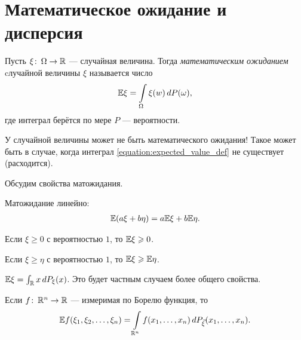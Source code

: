 \documentclass[../main.tex]{subfiles}
\begin{document}
\newpage
\section{Математическое ожидание и дисперсия}
\begin{df}
 Пусть $ \xi \colon \, \Omega \to \mathbb{R}$ --- случайная величина. Тогда \textit{математическим ожиданием} cлучайной величины $ \xi $ называется число
 \begin{align}
  \label{equation:expected_value_def}
  \mathbb E \xi = \int\limits_{\Omega}  \xi(w)\,dP(\omega),
 \end{align} где интеграл берётся по мере $ P $ --- вероятности.
\end{df}
\begin{remrk*}
 У случайной величины может не быть математического ожидания! Такое может быть в случае, когда интеграл \eqref{equation:expected_value_def} не существует (расходится).
\end{remrk*}
Обсудим свойства матожидания.
\begin{prop}
 Матожидание линейно:
 \begin{align*}
  \mathbb E(a\xi + b\eta) = a \mathbb E \xi + b \mathbb E \eta.
 \end{align*} 
\end{prop}
\begin{prop}
 Если $ \xi \geqslant 0 $ с вероятностью $ 1 $, то $ \mathbb E \xi \geqslant 0 $.
\end{prop}
\begin{prop}
 Если $ \xi \geqslant \eta $ с вероятностью $ 1 $, то $ \mathbb E\xi \geqslant \mathbb E\eta $.
\end{prop}
\begin{prop}
 $ \mathbb E\xi = \int_{\mathbb{R}} x\,dP_\xi(x)  $.
 Это будет частным случаем более общего свойства.
\end{prop}
\begin{prop}
 Если $ f \colon\, \mathbb{R}^{n}\to\mathbb{R} $ --- измеримая по Борелю функция, то
 \begin{align*}
  \mathbb E f(\xi_1, \xi_2, \ldots, \xi_n) = \int\limits_{\mathbb{R}^{n}} f(x_1, \ldots, x_n) \,d P_{\vec\xi}(x_1, \ldots, x_n).
 \end{align*} 
\end{prop}
\end{document}
